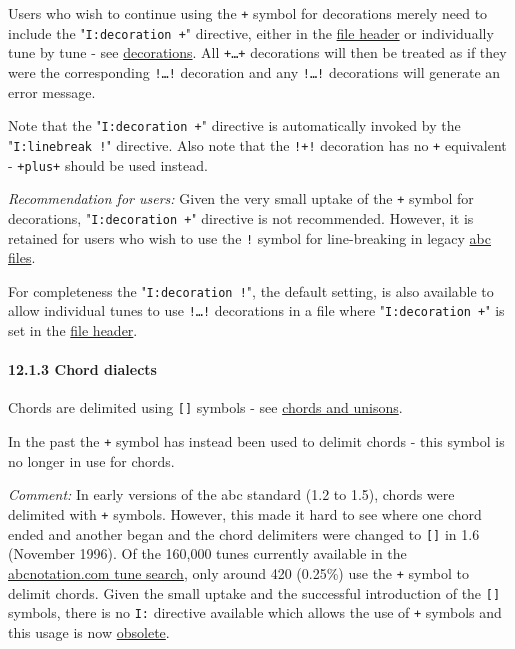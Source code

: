 Users who wish to continue using the \texttt{+} symbol for decorations
merely need to include the "\texttt{I:decoration\ +}" directive, either
in the \protect\hyperlink{file_header_definition}{file header} or
individually tune by tune - see
\protect\hyperlink{decorations}{decorations}. All \texttt{+\ldots{}+}
decorations will then be treated as if they were the corresponding
\texttt{!\ldots{}!} decoration and any \texttt{!\ldots{}!} decorations
will generate an error message.

Note that the "\texttt{I:decoration\ +}" directive is automatically
invoked by the "\texttt{I:linebreak\ !}" directive. Also note that the
\texttt{!+!} decoration has no \texttt{+} equivalent - \texttt{+plus+}
should be used instead.

\emph{Recommendation for users:} Given the very small uptake of the
\texttt{+} symbol for decorations, "\texttt{I:decoration\ +}" directive
is not recommended. However, it is retained for users who wish to use
the \texttt{!} symbol for line-breaking in legacy
\protect\hyperlink{abc_file_definition}{abc files}.

For completeness the "\texttt{I:decoration\ !}", the default setting, is
also available to allow individual tunes to use \texttt{!\ldots{}!}
decorations in a file where "\texttt{I:decoration\ +}" is set in the
\protect\hyperlink{file_header_definition}{file header}.

\hypertarget{chord_dialects}{\paragraph{12.1.3 Chord
dialects}\label{chord_dialects}}

Chords are delimited using \texttt{{[}{]}} symbols - see
\protect\hyperlink{chords_and_unisons}{chords and unisons}.

In the past the \texttt{+} symbol has instead been used to delimit
chords - this symbol is no longer in use for chords.

\emph{Comment:} In early versions of the abc standard (1.2 to 1.5),
chords were delimited with \texttt{+} symbols. However, this made it
hard to see where one chord ended and another began and the chord
delimiters were changed to \texttt{{[}{]}} in 1.6 (November 1996). Of
the 160,000 tunes currently available in the
\href{http://abcnotation.com/search}{abcnotation.com tune search}, only
around 420 (0.25\%) use the \texttt{+} symbol to delimit chords. Given
the small uptake and the successful introduction of the \texttt{{[}{]}}
symbols, there is no \texttt{I:} directive available which allows the
use of \texttt{+} symbols and this usage is now
\protect\hyperlink{outdated_syntax}{obsolete}.

